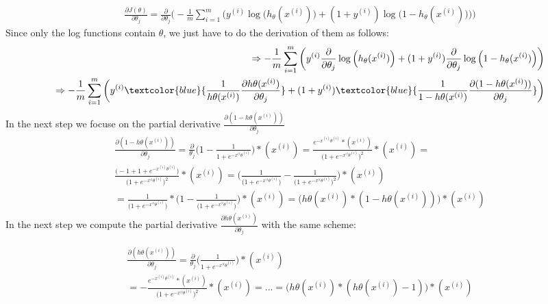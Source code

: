 \documentclass[a4paper]{article}
\begin{document}
\begin{align}
\frac{\partial J (\theta)}{\partial \theta_j} = \frac{\partial}{\partial \theta_j} \bigg(-\frac{1}{m} \sum_{i=1}^{m} \bigg(y^{(i)}\log\Big(h_{\theta}(x^{(i)})\Big) + (1 + y^{(i)})\log\Big(1 - h_{\theta}(x^{(i)})\Big)\bigg)\bigg)
\end{align}
Since only the log functions contain $\theta$, we just have to do the derivation of them as follows:
\begin{align}
\Rightarrow  -\frac{1}{m} \sum_{i=1}^{m} \bigg(y^{(i)}\frac{\partial}{\partial \theta_j} \log\Big(h_{\theta}(x^{(i)})\Big) + (1 + y^{(i)}) \frac{\partial}{\partial \theta_j} \log\Big(1 - h_{\theta}(x^{(i)})\Big)\bigg) \\
\Rightarrow -\frac{1}{m} \sum_{i=1}^{m} \bigg(y^{(i)} \textcolor{blue}{\frac{1}{h\theta(x^{(i)})} \frac{\partial h\theta(x^{(i)})}{\partial \theta_j}} + (1 + y^{(i)}) \textcolor{blue}{\frac{1}{1 - h\theta(x^{(i)})} \frac{\partial (1 - h\theta(x^{(i)}))}{\partial \theta_j}}\bigg)
\end{align}
In the next step we focuse on the partial derivative $\frac{\partial(1 - h\theta(x^{(i)}))}{\partial \theta_j}$
\begin{align}
\frac{\partial(1 - h\theta(x^{(i)}))}{\partial \theta_j} = \frac{\partial}{\theta_j} \Big(1 - \frac{1}{1 + e^{-x^{(i}\theta^{(i)}}} \Big) * (x^{(i)}) = %
\frac{e^{{-x^{(i)}\theta^{(i)}}} * (x^{(i)})}{\Big(1 + e^{-x^{(i}\theta^{(i)}}\Big)^2} * (x^{(i)}) = \\ \frac{\Big(-1 +1 + e^{{-x^{(i)}\theta^{(i)}}}\Big)}{\Big(1 + e^{-x^{(i}\theta^{(i)}}\Big)^2} * (x^{(i)})
= \bigg(\frac{1}{\Big(1 + e^{-x^{(i}\theta^{(i)}}\Big)} - \frac{1}{\Big(1 + e^{-x^{(i}\theta^{(i)}}\Big)^2}\bigg) * (x^{(i)})
\\ = \frac{1}{\Big(1 + e^{-x^{(i}\theta^{(i)}}\Big)} * \Big(1 - \frac{1}{\Big(1 + e^{-x^{(i}\theta^{(i)}}\Big)}\Big) * (x^{(i)}) = \Big(h\theta(x^{(i)}) * (1 - h\theta(x^{(i)}))\Big) * (x^{(i)})
\end{align}
\newpage
In the next step we compute the partial derivative $\frac{\partial h\theta(x^{(i)})}{\partial \theta_j}$ with the same scheme:

\begin{align}
\frac{\partial(h\theta(x^{(i)}))}{\partial \theta_j} = \frac{\partial}{\theta_j} \Big(\frac{1}{1 + e^{-x^{(i}\theta^{(i)}}}\Big) * (x^{(i)}) \\ 
= -\frac{e^{{-x^{(i)}\theta^{(i)}}} * (x^{(i)})}{\Big(1 + e^{-x^{(i}\theta^{(i)}}\Big)^2} * (x^{(i)}) = ... = \Big(h\theta(x^{(i)}) * (h\theta(x^{(i)}) - 1)\Big) * (x^{(i)})
\end{align}
\end{document}
